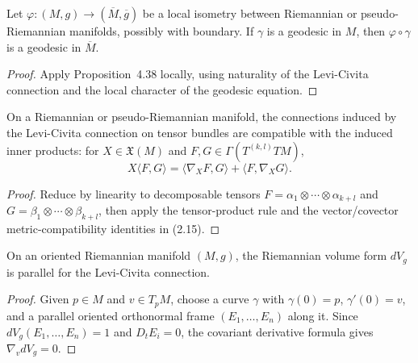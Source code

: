 \begin{corollary}
\label{cor:naturality-geodesics}

Let $\varphi:(M,g)\to(\overline M,\overline g)$ be a local isometry between
Riemannian or pseudo-Riemannian manifolds, possibly with boundary. If $\gamma$
is a geodesic in $M$, then $\varphi\circ\gamma$ is a geodesic in
$\overline M$.

\begin{proof}
\sketch Apply Proposition~4.38 locally, using naturality of the Levi-Civita
connection and the local character of the geodesic equation.
\end{proof}
\end{corollary}

\begin{proposition}
\label{prop:levi-civita-tensor-compatibility}

On a Riemannian or pseudo-Riemannian manifold, the connections induced by the
Levi-Civita connection on tensor bundles are compatible with the induced inner
products: for $X\in\mathfrak X(M)$ and
$F,G\in\Gamma(T^{(k,l)}TM)$,
\[
X\langle F,G\rangle
=\langle\nabla_XF,G\rangle+\langle F,\nabla_XG\rangle.
\]
\end{proposition}

\begin{proof}
\sketch Reduce by linearity to decomposable tensors
$F=\alpha_1\otimes\cdots\otimes\alpha_{k+l}$ and
$G=\beta_1\otimes\cdots\otimes\beta_{k+l}$, then apply the tensor-product
rule and the vector/covector metric-compatibility identities in (2.15).
\end{proof}

\begin{proposition}
\label{prop:riemannian-volume-form-parallel}

On an oriented Riemannian manifold $(M,g)$, the Riemannian volume form $dV_g$
is parallel for the Levi-Civita connection.

\begin{proof}
\sketch Given $p\in M$ and $v\in T_pM$, choose a curve $\gamma$ with
$\gamma(0)=p$, $\gamma'(0)=v$, and a parallel oriented orthonormal frame
$(E_1,\ldots,E_n)$ along it. Since
$dV_g(E_1,\ldots,E_n)=1$ and $D_tE_i=0$, the covariant derivative formula
gives $\nabla_vdV_g=0$.
\end{proof}
\end{proposition}

